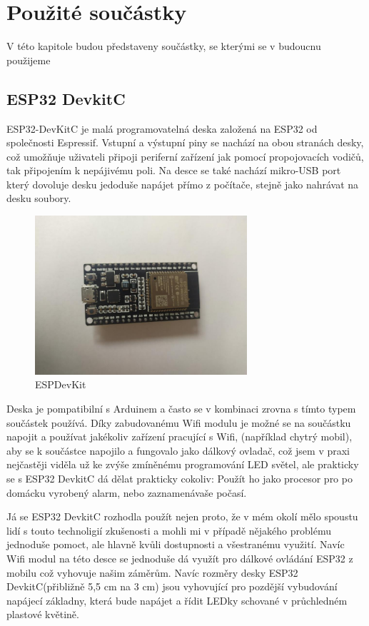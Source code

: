 \chapter{Použité součástky}

V této kapitole budou představeny součástky, se kterými se v budoucnu použijeme

\section{ESP32 DevkitC}
ESP32-DevKitC je malá programovatelná deska založená na ESP32 od společnosti Espressif. Vstupní a výstupní piny se nachází na obou stranách desky, což umožňuje uživateli připoji periferní zařízení jak pomocí propojovacích vodičů, tak připojením k nepájivému poli. Na desce se také nachází mikro-USB port který dovoluje  desku jedoduše napájet přímo z počítače, stejně jako nahrávat na desku soubory. 

\begin{figure}[htbp]
	\centering
	\includegraphics[width=0.7\textwidth]{img/ESPDevKit.jpg}
	\caption{ESPDevKit}
\end{figure}

Deska je pompatibilní s Arduinem a často se v kombinaci zrovna s tímto typem součástek používá. Díky zabudovanému Wifi modulu je možné se na součástku napojit a používat jakékoliv zařízení pracující s Wifi, (například chytrý mobil), aby se k součástce napojilo a fungovalo jako dálkový ovladač, což jsem v praxi nejčastěji viděla už ke zvýše zmíněnému programování LED světel, ale prakticky se s ESP32 DevkitC dá dělat prakticky cokoliv: Použít ho jako procesor pro po domácku vyrobený alarm, nebo zaznamenávaše počasí. 


Já se ESP32 DevkitC rozhodla použít nejen proto, že v mém okolí mělo spoustu lidí s touto technoligií zkušenosti a mohli mi v případě nějakého problému jednoduše pomoct, ale hlavně kvůli dostupnosti a všestranému využití. Navíc Wifi modul na této desce se jednoduše dá využít pro dálkové ovládání ESP32 z mobilu což vyhovuje našim záměrům. Navíc rozměry desky ESP32 DevkitC(přibližně 5,5 cm na 3 cm) jsou vyhovující pro pozdější vybudování napájecí základny, která bude napájet a řídit LEDky schované v průchledném plastové květině.



